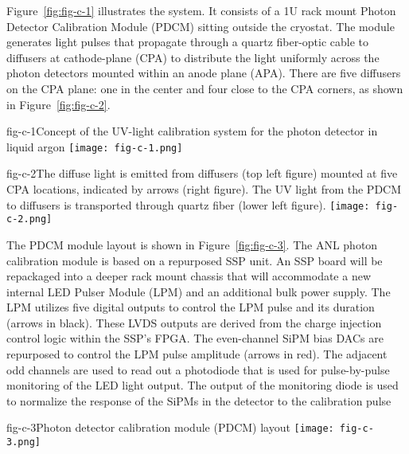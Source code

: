 Figure~\ref{fig:fig-c-1} illustrates the system. It
consists of a 1U rack mount Photon Detector Calibration Module (PDCM)
sitting outside the cryostat. The module generates light
pulses that propagate through a quartz fiber-optic cable to diffusers
at cathode-plane (CPA) to distribute the light uniformly across the
photon detectors mounted within an anode plane (APA).  There are five
diffusers on the CPA plane: one in the center and four close
to the CPA corners, as shown in Figure~\ref{fig:fig-c-2}. 

%
\begin{cdrfigure}{fig-c-1}{Concept of the UV-light calibration system for the photon
  detector in liquid argon} 
  \texttt{[image: fig-c-1.png]}
\end{cdrfigure}


\begin{cdrfigure}{fig-c-2}{The diffuse light is emitted from diffusers (top left figure)
  mounted at five CPA locations, indicated by arrows (right figure).
  The UV light from the PDCM to diffusers is transported through
  quartz fiber (lower left figure).}
\texttt{[image: fig-c-2.png]}
\end{cdrfigure}

The PDCM module layout is shown in Figure~\ref{fig:fig-c-3}. The ANL
photon calibration module is based on a repurposed SSP unit.  An SSP
board will be repackaged into a deeper rack mount chassis that will
accommodate a new internal LED Pulser Module (LPM) and an additional
bulk power supply. The LPM utilizes five digital outputs to control
the LPM pulse and its duration (arrows in black).  These LVDS outputs
are derived from the charge injection control logic within the SSP's
FPGA.  The even-channel SiPM bias DACs are repurposed to control the
LPM pulse amplitude (arrows in red).  The adjacent odd channels are
used to read out a photodiode that is used for pulse-by-pulse
monitoring of the LED light output.  The output of the monitoring
diode is used to normalize the response of the SiPMs in the detector
to the calibration pulse

\begin{cdrfigure}{fig-c-3}{Photon detector calibration module (PDCM) layout}
\texttt{[image: fig-c-3.png]}
\end{cdrfigure}

